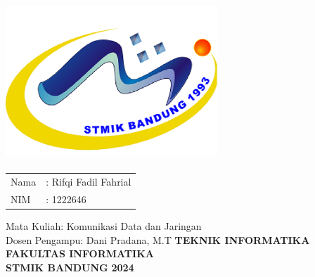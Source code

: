 \begin{spacing}{1}
  \maketitle
  \thispagestyle{empty}
  \begin{center}
  \includegraphics[width=8cm,height=6cm]{./images/logo.png}
  \end{center}
  \vspace{0.5 cm}
  \begin{center}
  \begin{tabular}{ll}
  Nama & : Rifqi Fadil Fahrial \\
  NIM & : 1222646\\
  \end{tabular}
  \newline
  \linebreak
  \linebreak
  Mata Kuliah: Komunikasi Data dan Jaringan \\
  Dosen Pengampu: Dani Pradana, M.T \linebreak
  \newline
  \newline
  \newline
  \newline
  \textbf {TEKNIK INFORMATIKA} \\
  \textbf {FAKULTAS INFORMATIKA} \\
  \textbf {STMIK BANDUNG}
  \linebreak
  \textbf {2024} \linebreak
  \end{center}
\end{spacing}
\pagebreak
